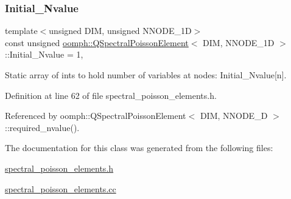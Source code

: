 \subsubsection{\texorpdfstring{Initial\+\_\+\+Nvalue}{Initial\_Nvalue}}
{\footnotesize\ttfamily template$<$unsigned D\+IM, unsigned N\+N\+O\+D\+E\+\_\+1D$>$ \\
const unsigned \hyperlink{classoomph_1_1QSpectralPoissonElement}{oomph\+::\+Q\+Spectral\+Poisson\+Element}$<$ D\+IM, N\+N\+O\+D\+E\+\_\+1D $>$\+::Initial\+\_\+\+Nvalue = 1\hspace{0.3cm}{\ttfamily [static]}, {\ttfamily [private]}}



Static array of ints to hold number of variables at nodes\+: Initial\+\_\+\+Nvalue\mbox{[}n\mbox{]}. 



Definition at line 62 of file spectral\+\_\+poisson\+\_\+elements.\+h.



Referenced by oomph\+::\+Q\+Spectral\+Poisson\+Element$<$ D\+I\+M, N\+N\+O\+D\+E\+\_\+D $>$\+::required\+\_\+nvalue().



The documentation for this class was generated from the following files\+:\begin{DoxyCompactItemize}
\item 
\hyperlink{spectral__poisson__elements_8h}{spectral\+\_\+poisson\+\_\+elements.\+h}\item 
\hyperlink{spectral__poisson__elements_8cc}{spectral\+\_\+poisson\+\_\+elements.\+cc}\end{DoxyCompactItemize}

